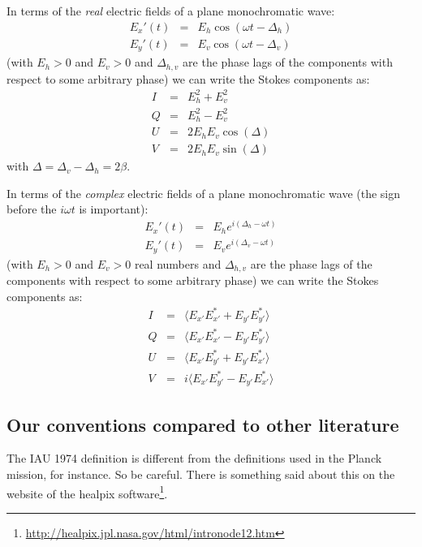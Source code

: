 \documentclass{report}
\begin{document}
In terms of the {\em real} electric fields of a plane monochromatic wave:
\begin{eqnarray}
  E_x'(t) &=& E_h \cos(\omega t-\Delta_h)\\
  E_y'(t) &=& E_v \cos(\omega t-\Delta_v)
\end{eqnarray}
(with $E_h>0$ and $E_v>0$ and $\Delta_{h,v}$ are the phase lags of the
components with respect to some arbitrary phase) we can write the Stokes
components as:
\begin{eqnarray}
  I &=& E_h^2 + E_v^2 \\
  Q &=& E_h^2 - E_v^2\\
  U &=& 2 E_h E_v \cos(\Delta) \\
  V &=& 2 E_h E_v \sin(\Delta)
\end{eqnarray}
with $\Delta = \Delta_v - \Delta_h = 2\beta$.

In terms of the {\em complex} electric fields of a plane monochromatic wave
(the sign before the $i\omega t$ is important):
\begin{eqnarray}
  E_x'(t) &=& E_h e^{i(\Delta_h-\omega t)}\\
  E_y'(t) &=& E_v e^{i(\Delta_v-\omega t)}
\end{eqnarray}
(with $E_h>0$ and $E_v>0$ real numbers 
and $\Delta_{h,v}$ are the phase lags of the
components with respect to some arbitrary phase) we can write the Stokes
components as:
\begin{eqnarray}
  I &=& \langle E_{x'}E_{x'}^{*} + E_{y'}E_{y'}^{*}   \rangle\\
  Q &=& \langle E_{x'}E_{x'}^{*} - E_{y'}E_{y'}^{*}   \rangle\\
  U &=& \langle E_{x'}E_{y'}^{*} + E_{y'}E_{x'}^{*}   \rangle\\
  V &=& i\langle E_{x'}E_{y'}^{*} - E_{y'}E_{x'}^{*}  \rangle
\end{eqnarray}


\subsection{Our conventions compared to other literature}
\label{sec-stokes-convent-differences}
The IAU 1974 definition is different from the definitions used in the
Planck mission, for instance. So be careful. There is something said about
this on the website of the healpix software\footnote{
\url{http://healpix.jpl.nasa.gov/html/intronode12.htm}}.
\end{document}

